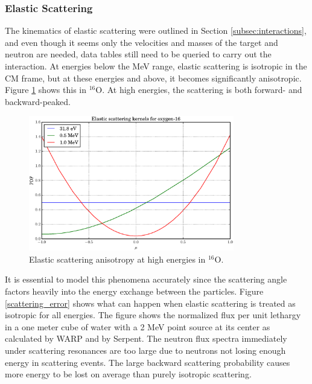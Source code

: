 \subsubsection{Elastic Scattering}

The kinematics of elastic scattering were outlined in Section \ref{subsec:interactions}, and even though it seems only the velocities and masses of the target and neutron are needed, data tables still need to be queried to carry out the interaction.  At energies below the MeV range, elastic scattering is isotropic in the CM frame, but at these energies and above, it becomes significantly anisotropic.  Figure \ref{scattering_anisotropy} shows this in $^{16}$O.  At high energies, the scattering is both forward- and backward-peaked.  

\begin{figure}[h!] 
  \centering
    \includegraphics[width=0.8\textwidth]{graphics/scattering_anisotropy.eps}
     \caption{Elastic scattering anisotropy at high energies in $^{16}$O.  \label{scattering_anisotropy}}
\end{figure}

It is essential to model this phenomena accurately since the scattering angle factors heavily into the energy exchange between the particles.  Figure \ref{scattering_error} shows what can happen when elastic scattering is treated as isotropic for all energies.  The figure shows the normalized flux per unit lethargy in a one meter cube of water with a 2 MeV point source at its center as calculated by WARP and by Serpent.  The neutron flux spectra immediately under scattering resonances are too large due to neutrons not losing enough energy in scattering events. %
  The large backward scattering probability causes more energy to be lost on average than purely isotropic scattering.%

